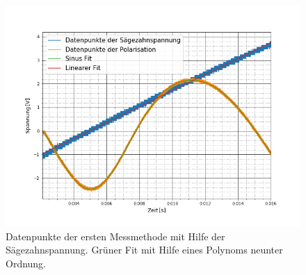 \begin{figure}[ht]
	\includegraphics[scale=0.5]{Bild/V1_15}
	\centering
	\caption[Plot zu Versuchsteil 1 Nr.15]{Datenpunkte der ersten Messmethode mit Hilfe der Sägezahnspannung. Grüner Fit mit Hilfe eines Polynoms neunter Ordnung.}
\end{figure}
\FloatBarrier

